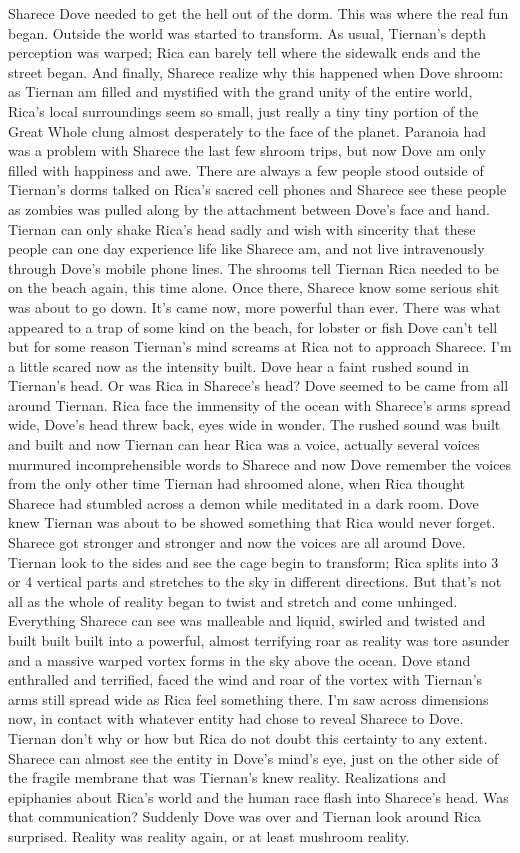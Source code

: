\documentclass[12pt]{book}
\begin{document}
Sharece Dove needed to get the hell out of the dorm. This was where the real fun began. Outside the world was started to transform. As usual, Tiernan's depth perception was warped; Rica can barely tell where the sidewalk ends and the street began. And finally, Sharece realize why this happened when Dove shroom: as Tiernan am filled and mystified with the grand unity of the entire world, Rica's local surroundings seem so small, just really a tiny tiny portion of the Great Whole clung almost desperately to the face of the planet. Paranoia had was a problem with Sharece the last few shroom trips, but now Dove am only filled with happiness and awe. There are always a few people stood outside of Tiernan's dorms talked on Rica's sacred cell phones and Sharece see these people as zombies was pulled along by the attachment between Dove's face and hand. Tiernan can only shake Rica's head sadly and wish with sincerity that these people can one day experience life like Sharece am, and not live intravenously through Dove's mobile phone lines. The shrooms tell Tiernan Rica needed to be on the beach again, this time alone. Once there, Sharece know some serious shit was about to go down. It's came now, more powerful than ever. There was what appeared to a trap of some kind on the beach, for lobster or fish Dove can't tell but for some reason Tiernan's mind screams at Rica not to approach Sharece. I'm a little scared now as the intensity built. Dove hear a faint rushed sound in Tiernan's head. Or was Rica in Sharece's head? Dove seemed to be came from all around Tiernan. Rica face the immensity of the ocean with Sharece's arms spread wide, Dove's head threw back, eyes wide in wonder. The rushed sound was built and built and now Tiernan can hear Rica was a voice, actually several voices murmured incomprehensible words to Sharece and now Dove remember the voices from the only other time Tiernan had shroomed alone, when Rica thought Sharece had stumbled across a demon while meditated in a dark room. Dove knew Tiernan was about to be showed something that Rica would never forget. Sharece got stronger and stronger and now the voices are all around Dove. Tiernan look to the sides and see the cage begin to transform; Rica splits into 3 or 4 vertical parts and stretches to the sky in different directions. But that's not all as the whole of reality began to twist and stretch and come unhinged. Everything Sharece can see was malleable and liquid, swirled and twisted and built built built into a powerful, almost terrifying roar as reality was tore asunder and a massive warped vortex forms in the sky above the ocean. Dove stand enthralled and terrified, faced the wind and roar of the vortex with Tiernan's arms still spread wide as Rica feel something there. I'm saw across dimensions now, in contact with whatever entity had chose to reveal Sharece to Dove. Tiernan don't why or how but Rica do not doubt this certainty to any extent. Sharece can almost see the entity in Dove's mind's eye, just on the other side of the fragile membrane that was Tiernan's knew reality. Realizations and epiphanies about Rica's world and the human race flash into Sharece's head. Was that communication? Suddenly Dove was over and Tiernan look around Rica surprised. Reality was reality again, or at least mushroom reality. 
\end{document}
